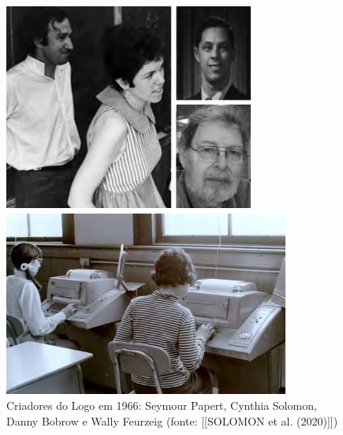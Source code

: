 \documentclass[
12pt,		%
openright,	%
twoside,  %
a4paper,			%
chapter=TITLE,		%
english,			%
french,				%
spanish,			%
brazil				%
]{USPSC-classe/USPSC}
\begin{document}
\captionsetup{format=plain}
\begin{figure}[max size={\textwidth}{\textheight}]

\centering


\begin{minipage}[b]{0.4\linewidth}
        \centering
                \includegraphics[width=1.0\linewidth]{../../imagens/criadores-logo.png}
                \caption{Criadores do Logo em 1966: Seymour Papert, Cynthia Solomon, Danny Bobrow e Wally Feurzeig (fonte:  [[SOLOMON et al. (2020)]])}
                \label{c40acbbf355efda753f44d02f297bbce67f5e4b8}
\end{minipage}%
\hspace{0.5cm}
\begin{minipage}[b]{0.4\linewidth}
        \centering
                \includegraphics[width=1.0\linewidth]{../../imagens/criancas-1968.png}

\end{minipage}
\end{figure}
\end{document}

